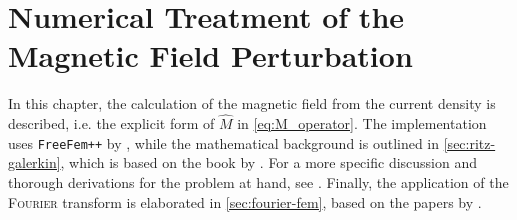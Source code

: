 \section{Numerical Treatment of the Magnetic Field Perturbation}
\label{sec:compute_Bn}

In this chapter, the calculation of the magnetic field from the current density is described, i.e. the explicit form of $\hat{M}$ in \cref{eq:M_operator}. The implementation uses \texttt{FreeFem++} by \textcite{Hecht12}, while the mathematical background is outlined in \cref{sec:ritz-galerkin}, which is based on the book by \textcite{Jin02}. For a more specific discussion and thorough derivations for the problem at hand, see \textcite{Seeber18}. Finally, the application of the \textsc{Fourier} transform is elaborated in \cref{sec:fourier-fem}, based on the papers by \textcite{Heyn08,Albert16}.

